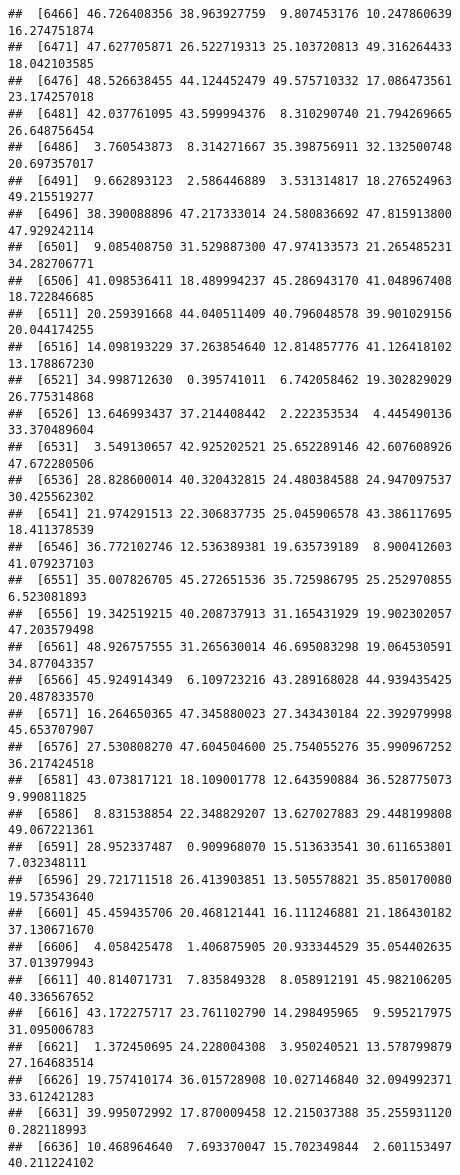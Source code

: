 \documentclass[
]{article}
\begin{document}
\begin{verbatim}
##  [6466] 46.726408356 38.963927759  9.807453176 10.247860639 16.274751874
##  [6471] 47.627705871 26.522719313 25.103720813 49.316264433 18.042103585
##  [6476] 48.526638455 44.124452479 49.575710332 17.086473561 23.174257018
##  [6481] 42.037761095 43.599994376  8.310290740 21.794269665 26.648756454
##  [6486]  3.760543873  8.314271667 35.398756911 32.132500748 20.697357017
##  [6491]  9.662893123  2.586446889  3.531314817 18.276524963 49.215519277
##  [6496] 38.390088896 47.217333014 24.580836692 47.815913800 47.929242114
##  [6501]  9.085408750 31.529887300 47.974133573 21.265485231 34.282706771
##  [6506] 41.098536411 18.489994237 45.286943170 41.048967408 18.722846685
##  [6511] 20.259391668 44.040511409 40.796048578 39.901029156 20.044174255
##  [6516] 14.098193229 37.263854640 12.814857776 41.126418102 13.178867230
##  [6521] 34.998712630  0.395741011  6.742058462 19.302829029 26.775314868
##  [6526] 13.646993437 37.214408442  2.222353534  4.445490136 33.370489604
##  [6531]  3.549130657 42.925202521 25.652289146 42.607608926 47.672280506
##  [6536] 28.828600014 40.320432815 24.480384588 24.947097537 30.425562302
##  [6541] 21.974291513 22.306837735 25.045906578 43.386117695 18.411378539
##  [6546] 36.772102746 12.536389381 19.635739189  8.900412603 41.079237103
##  [6551] 35.007826705 45.272651536 35.725986795 25.252970855  6.523081893
##  [6556] 19.342519215 40.208737913 31.165431929 19.902302057 47.203579498
##  [6561] 48.926757555 31.265630014 46.695083298 19.064530591 34.877043357
##  [6566] 45.924914349  6.109723216 43.289168028 44.939435425 20.487833570
##  [6571] 16.264650365 47.345880023 27.343430184 22.392979998 45.653707907
##  [6576] 27.530808270 47.604504600 25.754055276 35.990967252 36.217424518
##  [6581] 43.073817121 18.109001778 12.643590884 36.528775073  9.990811825
##  [6586]  8.831538854 22.348829207 13.627027883 29.448199808 49.067221361
##  [6591] 28.952337487  0.909968070 15.513633541 30.611653801  7.032348111
##  [6596] 29.721711518 26.413903851 13.505578821 35.850170080 19.573543640
##  [6601] 45.459435706 20.468121441 16.111246881 21.186430182 37.130671670
##  [6606]  4.058425478  1.406875905 20.933344529 35.054402635 37.013979943
##  [6611] 40.814071731  7.835849328  8.058912191 45.982106205 40.336567652
##  [6616] 43.172275717 23.761102790 14.298495965  9.595217975 31.095006783
##  [6621]  1.372450695 24.228004308  3.950240521 13.578799879 27.164683514
##  [6626] 19.757410174 36.015728908 10.027146840 32.094992371 33.612421283
##  [6631] 39.995072992 17.870009458 12.215037388 35.255931120  0.282118993
##  [6636] 10.468964640  7.693370047 15.702349844  2.601153497 40.211224102

\end{verbatim}
\end{document}
